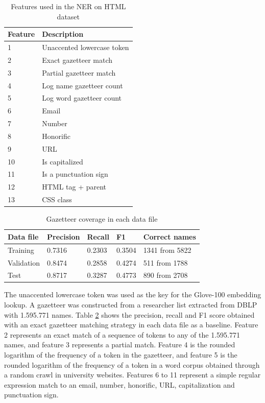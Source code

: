 \documentclass[sigconf]{acmart}
\begin{document}
\begin{table}[h]
  \small
  \begin{center}
    \begin{tabular}{ ll }
      \toprule
      Feature & Description \\
      \midrule
      1  & Unaccented lowercase token \\
      2  & Exact gazetteer match \\
      3  & Partial gazetteer match \\
      4  & Log name gazetteer count\\
      5  & Log word gazetteer count\\
      6  & Email \\
      7  & Number \\
      8  & Honorific \\
      9  & URL \\
      10 & Is capitalized \\
      11 & Is a punctuation sign \\
      12 & HTML tag + parent \\
      13 & CSS class \\
      \bottomrule
    \end{tabular}
  \end{center}
  \caption{Features used in the NER on HTML dataset}
  \label{tab:features}
\end{table}

\begin{table}[h]
  \small
  \begin{center}
    \begin{tabular}{ lllll }
      \toprule
      Data file & Precision & Recall & F1 & Correct names \\
      \midrule
      Training   & 0.7316 & 0.2303 & 0.3504 & 1341 from 5822 \\ 
      Validation & 0.8474 & 0.2858 & 0.4274 & 511 from 1788 \\ 
      Test       & 0.8717 & 0.3287 & 0.4773 & 890 from 2708 \\ 
      \bottomrule
    \end{tabular}
  \end{center}
  \caption{Gazetteer coverage in each data file}
  \label{tab:gazetteer}
\end{table}

The unaccented lowercase token was used as the key for the Glove-100 embedding lookup.
A gazetteer was constructed from a researcher list extracted from DBLP with 1.595.771
names. Table \ref{tab:gazetteer} shows the precision, recall and F1 score obtained with an
exact gazetteer matching strategy in each data file as a baseline.
Feature 2 represents an exact match of a sequence of tokens to any of the 1.595.771 
names, and feature 3 represents a partial match. Feature 4 is the rounded logarithm of 
the frequency of a token in the gazetteer, and feature 5 is the rounded logarithm of the frequency
of a token in a word corpus obtained through a random crawl in university websites.
Features 6 to 11 represent a simple regular expression match to an email, number, 
honorific, URL, capitalization and punctuation sign.
\end{document}
